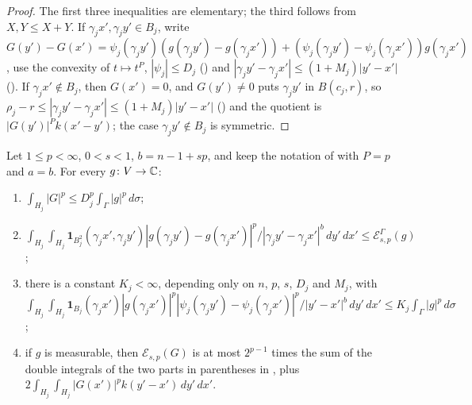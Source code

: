 \begin{proof}
\leanok
The first three inequalities are elementary; the third follows from $X, Y \leq X + Y$. If
$\gamma_j x', \gamma_j y' \in B_j$, write
$G(y') - G(x') = \psi_j(\gamma_j y') (g(\gamma_j y') - g(\gamma_j x'))
+ (\psi_j(\gamma_j y') - \psi_j(\gamma_j x')) g(\gamma_j x')$, use the convexity of $t \mapsto t^P$,
$|\psi_j| \leq D_j$ () and
$|\gamma_j y' - \gamma_j x'| \leq (1 + M_j) |y' - x'|$ (). If
$\gamma_j x' \notin B_j$, then $G(x') = 0$, and $G(y') \neq 0$ puts $\gamma_j y'$ in
$B(c_j, r)$, so $\rho_j - r \leq |\gamma_j y' - \gamma_j x'| \leq (1 + M_j) |y' - x'|$
() and the quotient is $|G(y')|^P k(x' - y')$; the case
$\gamma_j y' \notin B_j$ is symmetric.
\end{proof}

\begin{lemma}
\label{lem:chart-piece-parts}
\leanok
{}
Let $1 \leq p < \infty$, $0 < s < 1$, $b = n - 1 + sp$, and keep the notation of
 with $P = p$ and $a = b$. For every $g \colon V \to \mathbb{C}$:
\begin{enumerate}
  \item $\int_{H_j} |G|^p \leq D_j^p \int_\Gamma |g|^p \, d\sigma$;
  \item $\int_{H_j} \int_{H_j} \mathbf 1_{B_j^2}(\gamma_j x', \gamma_j y')
    |g(\gamma_j y') - g(\gamma_j x')|^p / |\gamma_j y' - \gamma_j x'|^b \, dy' \, dx'
    \leq \mathcal{E}^\Gamma_{s,p}(g)$;
  \item there is a constant $K_j < \infty$, depending only on $n$, $p$, $s$, $D_j$ and $M_j$,
    with
    $\int_{H_j} \int_{H_j} \mathbf 1_{B_j}(\gamma_j x') |g(\gamma_j x')|^p
    |\psi_j(\gamma_j y') - \psi_j(\gamma_j x')|^p / |y' - x'|^b \, dy' \, dx'
    \leq K_j \int_\Gamma |g|^p \, d\sigma$;
  \item if $g$ is measurable, then $\mathcal{E}_{s,p}(G)$ is at most $2^{p-1}$ times the sum of
    the double integrals of the two parts in parentheses in ,
    plus $2 \int_{H_j} \int_{H_j} |G(x')|^p k(y' - x') \, dy' \, dx'$.
\end{enumerate}
\end{lemma}

